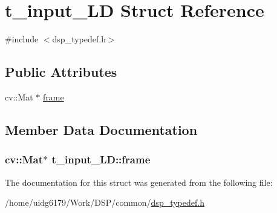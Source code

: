 \hypertarget{structt__input__LD}{}\section{t\+\_\+input\+\_\+\+LD Struct Reference}
\label{structt__input__LD}


{\ttfamily \#include $<$dsp\+\_\+typedef.\+h$>$}

\subsection*{Public Attributes}
\begin{DoxyCompactItemize}
\item 
cv\+::\+Mat $\ast$ \hyperlink{structt__input__LD_a8a552228694ab3c2dd4ad843bb72a078}{frame}
\end{DoxyCompactItemize}


\subsection{Member Data Documentation}
\subsubsection[{\texorpdfstring{frame}{frame}}]{\setlength{\rightskip}{0pt plus 5cm}cv\+::\+Mat$\ast$ t\+\_\+input\+\_\+\+L\+D\+::frame}\hypertarget{structt__input__LD_a8a552228694ab3c2dd4ad843bb72a078}{}\label{structt__input__LD_a8a552228694ab3c2dd4ad843bb72a078}


The documentation for this struct was generated from the following file\+:\begin{DoxyCompactItemize}
\item 
/home/uidg6179/\+Work/\+D\+S\+P/common/\hyperlink{dsp__typedef_8h}{dsp\+\_\+typedef.\+h}\end{DoxyCompactItemize}
